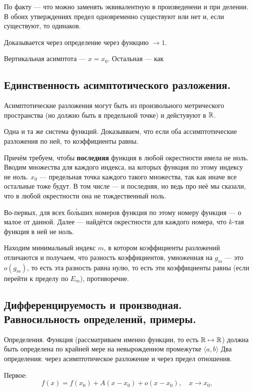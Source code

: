\documentclass[12pt, a4paper]{article}
\begin{document}
По факту — что можно заменять эквивалентную в произведенени и при делении.
В обоих утверждениях предел одновременно существуют или нет и, если существуют, то одинаков.

Доказывается через определение через функцию $\to 1$.

Вертикальная асимптота — $x = x_0$.
Остальная — как 

\subsection{Единственность асимптотического разложения.}

Асимптотические разложения могут быть из произвольного метрического пространства 
(но должно быть в предельной точке) и дейстувуют в ${\mathbb{R}}$.

Одна и та же система функций. 
Доказывваем, что если оба ассимптотические разложения по ней, 
то коэффициенты равны.

Причём требуем, чтобы \textbf{последняя} функция в любой окрестности имела не ноль.
Вводим множества для каждого индекса, на которых функция по этому индексу не ноль.
$x_0$ — предельная точка каждого такого множества, так как иначе все остальные тоже будут.
В том числе — и последняя, но ведь про неё мы сказали, что в любой окрестности она не тождественный ноль.

Во-первых, для всех бо\'льших номеров функция по этому номеру функция — о малое от данной.
Далее — найдётся окрестности для каждого номера, что $k$-тая функция в ней не ноль.

Находим минимальный индекс $m$, в котором коэффициенты разложений отличаются и получаем,
что разность коэффициентов, умноженная на $g_m$ — это $o(g_m)$, то есть эта разность равна нулю, 
то есть эти коэффициенты равны (если перейти к пределу по $E_m$), противоречие.


\subsection{Дифференцируемость и производная. Равносильность определений, примеры.}

Определения.
Функция (рассматриваем именно функции, то есть ${\mathbb{R}} \mapsto {\mathbb{R}}$) 
должна быть определена по крайней мере на невырожденном промежутке $\langle a, b \rangle$
Два определения: через асимптотическое разложение и через предел отношения.

Первое:
\begin{equation*}
    f(x)=f\left(x_{0}\right)+A\left(x-x_{0}\right)+o\left(x-x_{0}\right), \quad x \rightarrow x_{0},
\end{equation*}
\end{document}
